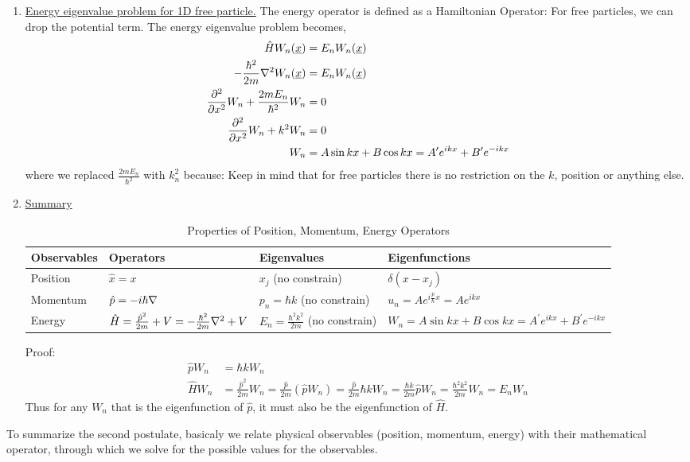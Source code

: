 \documentclass{school-22.101-notes}
\begin{document}
\begin{enumerate}
\item \uline{Energy eigenvalue problem for 1D free particle.} The energy operator is defined as a Hamiltonian Operator: 
For free particles, we can drop the potential term. The energy eigenvalue problem becomes,
\begin{align}
 \hat{H} W_n (\underline{x}) &= E_n W_n (\underline{x} ) \\
 -\frac{\hbar^2}{2m} \nabla^2 W_n (\underline{x}) &= E_n W_n (\underline{x} ) \\
 \frac{\partial^{2} }{\partial x ^{2}} W_n + \frac{2m E_n}{\hbar^2} W_n &= 0 \\
 \frac{\partial^{2} }{\partial x ^{2}} W_n + k^2 W_n &= 0  \\
 W_n &= A \sin kx + B \cos kx = A^{\prime} e^{ikx} + B^{\prime} e^{-ikx}
\end{align}
where we replaced $\frac{2m E_n}{\hbar^2}$ with $k_n^2$ because:
Keep in mind that for free particles there is no restriction on the $k$, position or anything else. 


\item \uline{Summary}
\begin{table}[ht]
\begin{tabular}{|l|p{1.6in}|l|p{2in}|} \hline
Observables & Operators & Eigenvalues & Eigenfunctions \\ \hline
Position & $\hat{x} = x$ & $x_j$ (no constrain) & $\delta(x-x_j)$ \\ \hline
Momentum & $\hat{p} = - i \hbar \nabla $ & $p_n = \hbar k$ (no constrain) & $u_n = A e^{i \frac{p}{\hbar} x } = A e^{i k x} $ \\ \hline
Energy & $\hat{H} = \frac{\hat{p}^2}{2m} + V = - \frac{\hbar^2}{2m} \nabla^2 + V$ & $E_n = \frac{\hbar^2 k^2}{2m}$ (no constrain) & $W_n = A \sin kx + B \cos kx = A^{\prime} e^{ikx} + B^{\prime} e^{-ikx} $\\ \hline
\end{tabular}
\caption{Properties of Position, Momentum, Energy Operators}
\end{table}

 Proof:
\begin{align}
\hat{p} W_n &= \hbar k W_n \\
\hat{H} W_n &= \frac{\hat{p}^2}{2m} W_n 
= \frac{\hat{p}}{2m} (\hat{p} W_n) 
= \frac{\hat{p}}{2m} \hbar k W_n = \frac{\hbar k}{2m} \hat{p} W_n = \frac{\hbar^2 k^2}{2m} W_n = E_n W_n
\end{align}
Thus for any $W_n$ that is the eigenfunction of $\hat{p}$, it must also be the eigenfunction of $\hat{H}$. 
\end{enumerate}
To summarize the second postulate, basicaly we relate physical observables (position, momentum, energy) with their mathematical operator, through which we solve for the possible values for the observables.
\end{document}
